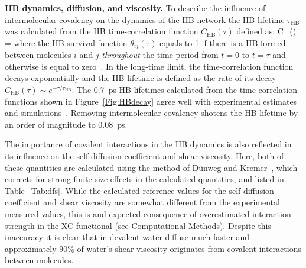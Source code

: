 \documentclass[aps,prl,reprint,amsmath,amssymb]{revtex4-1}
\begin{document}
\textbf{HB dynamics, diffusion, and viscosity.} To describe the influence of intermolecular covalency on the dynamics of the HB network the HB lifetime $\tau_{\text{HB}}$ was calculated from the HB time-correlation function $C_{\text{HB}}(\tau)$ defined as:
%
\bea
C_{}(\tau) =  \label{Eq:HBdecay}
\eea
%
where the HB survival function $\theta_{ij}(\tau)$ equals to 1 if there is a HB formed between molecules $i$ and $j$ \emph{throughout} the time period from $t=0$ to $t=\tau$ and otherwise is equal to zero~\cite{rapaport1983hydrogen,starr1999fast}. 
In the long-time limit, the time-correlation function decays exponentially and the HB lifetime is defined as the rate of its decay $C_{\text{HB}}(\tau) \sim e^{-\tau/\tau_{\text{HB}}}$. 
The 0.7~ps HB lifetimes calculated from the time-correlation functions shown in Figure~\ref{Fig:HBdecay} agree well with experimental estimates \cite{lawrence2003ultrafast} and simulations~\cite{marti1996molecular,starr1999fast}. Removing intermolecular covalency shotens the HB lifetime by an order of magnitude to 0.08~ps. 


The importance of covalent interactions in the HB dynamics is also reflected in its influence on the self-diffusion coefficient and shear viscosity. 
Here, both of these quantities are calculated using the method of D\"unweg and Kremer~\cite{dunweg1993molecular}, which corrects for strong finite-size effects in the calculated quantities, and listed in Table~\ref{Tab:dfs}. 
While the calculated reference values for the self-diffusion coefficient and shear viscosity are somewhat different from the experimental measured values, this is and expected consequence of overestimated interaction strength in the XC functional (see 
Computational Methods). 
Despite this inaccuracy it is clear that in devalent water diffuse much faster and approximately 90\% of water's shear viscosity originates from covalent interactions between molecules.
\end{document}
